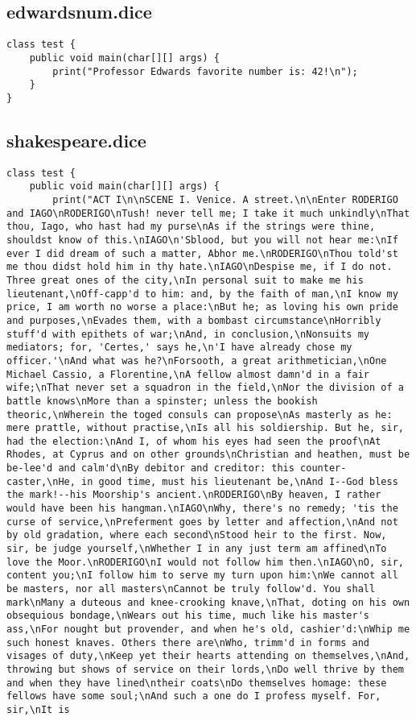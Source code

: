 \subsection{edwardsnum.dice}
\begin{verbatim}
class test {
	public void main(char[][] args) {
		print("Professor Edwards favorite number is: 42!\n");
	}
}
\end{verbatim}
\pagebreak
\subsection{shakespeare.dice}
\begin{verbatim}
class test {
	public void main(char[][] args) {
		print("ACT I\n\nSCENE I. Venice. A street.\n\nEnter RODERIGO and IAGO\nRODERIGO\nTush! never tell me; I take it much unkindly\nThat thou, Iago, who hast had my purse\nAs if the strings were thine, shouldst know of this.\nIAGO\n'Sblood, but you will not hear me:\nIf ever I did dream of such a matter, Abhor me.\nRODERIGO\nThou told'st me thou didst hold him in thy hate.\nIAGO\nDespise me, if I do not. Three great ones of the city,\nIn personal suit to make me his lieutenant,\nOff-capp'd to him: and, by the faith of man,\nI know my price, I am worth no worse a place:\nBut he; as loving his own pride and purposes,\nEvades them, with a bombast circumstance\nHorribly stuff'd with epithets of war;\nAnd, in conclusion,\nNonsuits my mediators; for, 'Certes,' says he,\n'I have already chose my officer.'\nAnd what was he?\nForsooth, a great arithmetician,\nOne Michael Cassio, a Florentine,\nA fellow almost damn'd in a fair wife;\nThat never set a squadron in the field,\nNor the division of a battle knows\nMore than a spinster; unless the bookish theoric,\nWherein the toged consuls can propose\nAs masterly as he: mere prattle, without practise,\nIs all his soldiership. But he, sir, had the election:\nAnd I, of whom his eyes had seen the proof\nAt Rhodes, at Cyprus and on other grounds\nChristian and heathen, must be be-lee'd and calm'd\nBy debitor and creditor: this counter-caster,\nHe, in good time, must his lieutenant be,\nAnd I--God bless the mark!--his Moorship's ancient.\nRODERIGO\nBy heaven, I rather would have been his hangman.\nIAGO\nWhy, there's no remedy; 'tis the curse of service,\nPreferment goes by letter and affection,\nAnd not by old gradation, where each second\nStood heir to the first. Now, sir, be judge yourself,\nWhether I in any just term am affined\nTo love the Moor.\nRODERIGO\nI would not follow him then.\nIAGO\nO, sir, content you;\nI follow him to serve my turn upon him:\nWe cannot all be masters, nor all masters\nCannot be truly follow'd. You shall mark\nMany a duteous and knee-crooking knave,\nThat, doting on his own obsequious bondage,\nWears out his time, much like his master's ass,\nFor nought but provender, and when he's old, cashier'd:\nWhip me such honest knaves. Others there are\nWho, trimm'd in forms and visages of duty,\nKeep yet their hearts attending on themselves,\nAnd, throwing but shows of service on their lords,\nDo well thrive by them and when they have lined\ntheir coats\nDo themselves homage: these fellows have some soul;\nAnd such a one do I profess myself. For, sir,\nIt is 
\end{verbatim}
